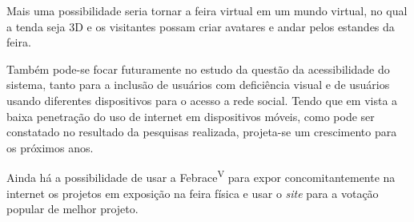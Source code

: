 Mais uma possibilidade seria tornar a feira virtual em um mundo virtual, no qual a tenda seja 3D e os visitantes possam criar avatares e andar pelos estandes da feira.

Também pode-se focar futuramente no estudo da questão da acessibilidade do sistema, tanto para a inclusão de usuários com deficiência visual e de usuários usando diferentes dispositivos para o acesso a rede social. Tendo que em vista a baixa penetração do uso de internet em dispositivos móveis, como pode ser constatado no resultado da pesquisas realizada, projeta-se um crescimento para os próximos anos.

Ainda há a possibilidade de usar a Febrace\textsuperscript{V} para expor concomitantemente na internet os projetos em exposição na feira física e usar o \textit{site} para a votação popular de melhor projeto.

